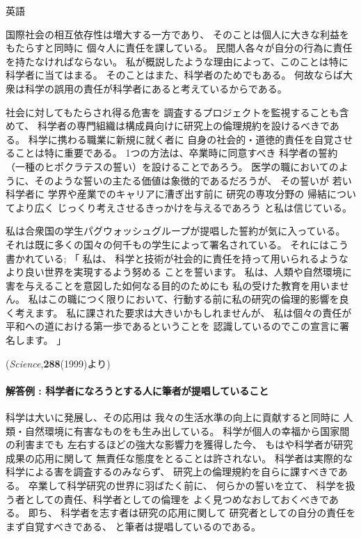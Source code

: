 \documentclass[fleqn]{jbook}
\begin{document}
\begin{answer}{英語}{}
\begin{subanswers}
国際社会の相互依存性は増大する一方であり、
そのことは個人に大きな利益をもたらすと同時に
個々人に責任を課している。
民間人各々が自分の行為に責任を持たなければならない。
私が概説したような理由によって、このことは特に科学者に当てはまる。
そのことはまた、科学者のためでもある。
何故ならば大衆は科学の誤用の責任が科学者にあると考えているからである。

社会に対してもたらされ得る危害を
調査するプロジェクトを監視することも含めて、
科学者の専門組織は構成員向けに研究上の倫理規約を設けるべきである。
科学に携わる職業に新規に就く者に
自身の社会的・道徳的責任を自覚させることは特に重要である。
1つの方法は、卒業時に同意すべき
科学者の誓約（一種のヒポクラテスの誓い）を設けることであろう。
医学の職においてのように、そのような誓いの主たる価値は象徴的であるだろうが、
その誓いが
若い科学者に
学界や産業でのキャリアに漕ぎ出す前に
研究の専攻分野の
帰結についてより広く
じっくり考えさせるきっかけを与えるであろう
と私は信じている。

私は合衆国の学生パグウォッシュグループが提唱した誓約が気に入っている。
それは既に多くの国々の何千もの学生によって署名されている。
それにはこう書かれている;
「
私は、
科学と技術が社会的に責任を持って用いられるようなより良い世界を実現するよう努める
ことを誓います。
私は、人類や自然環境に害を与えることを意図した如何なる目的のためにも
私の受けた教育を用いません。
私はこの職につく限りにおいて、行動する前に私の研究の倫理的影響を良く考えます。
私に課された要求は大きいかもしれませんが、
私は個々の責任が平和への道における第一歩であるということを
認識しているのでこの宣言に署名します。
」

\begin{flushright}
(\textit{Science},\textbf{288}(1999)より)
\end{flushright}


\paragraph{解答例 : 科学者になろうとする人に筆者が提唱していること}

科学は大いに発展し、その応用は
我々の生活水準の向上に貢献すると同時に
人類・自然環境に有害なものをも生み出している。
科学が個人の幸福から国家間の利害までも
左右するほどの強大な影響力を獲得した今、
もはや科学者が研究成果の応用に関して
無責任な態度をとることは許されない。
科学者は実際的な科学による害を調査するのみならず、
研究上の倫理規約を自らに課すべきである。
卒業して科学研究の世界に羽ばたく前に、
何らかの誓いを立て、
科学を扱う者としての責任、科学者としての倫理を
よく見つめなおしておくべきである。
即ち、
科学者を志す者は研究の応用に関して
研究者としての自分の責任をまず自覚すべきである、
と筆者は提唱しているのである。


\end{subanswers}
\end{answer}
\end{document}
